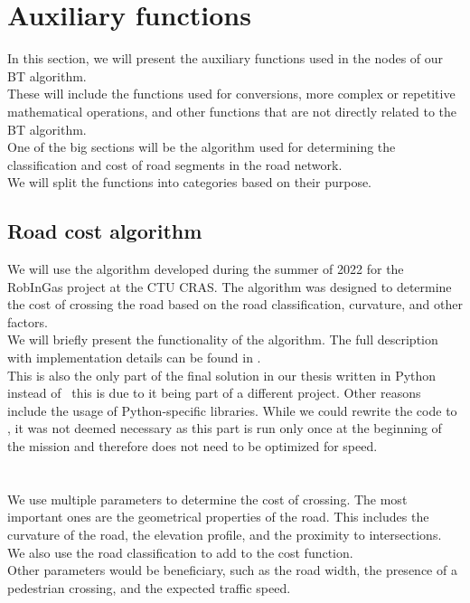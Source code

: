 \section{Auxiliary functions}
    In this section, we will present the auxiliary functions used in the nodes of our BT algorithm.\\
    These will include the functions used for conversions, more complex or repetitive mathematical operations, and other functions that are not directly related to the BT algorithm.\\
    One of the big sections will be the algorithm used for determining the classification and cost of road segments in the road network.\\
    We will split the functions into categories based on their purpose.

    \subsection{Road cost algorithm}
        \label{sec:road_cost}
        We will use the algorithm developed during the summer of 2022 for the RobInGas project at the CTU CRAS. The algorithm was designed to determine the cost of crossing the road based on the road classification, curvature, and other factors.\\
        We will briefly present the functionality of the algorithm. The full description with implementation details can be found in \cite{Road_cost_docs}.\\
        This is also the only part of the final solution in our thesis written in Python instead of \CC\ this is due to it being part of a different project. Other reasons include the usage of Python-specific libraries. While we could rewrite the code to \CC, it was not deemed necessary as this part is run only once at the beginning of the mission and therefore does not need to be optimized for speed.\\\\
        \\
            We use multiple parameters to determine the cost of crossing. The most important ones are the geometrical properties of the road. This includes the curvature of the road, the elevation profile, and the proximity to intersections. We also use the road classification to add to the cost function.\\
            Other parameters would be beneficiary, such as the road width, the presence of a pedestrian crossing, and the expected traffic speed.\\
